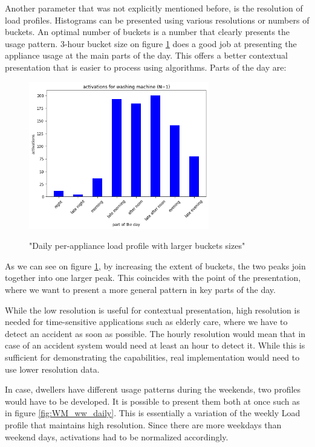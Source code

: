 Another parameter that was not explicitly mentioned before, is the resolution of load profiles. 
Histograms can be presented using various resolutions or numbers of buckets.
An optimal number of buckets is a number that clearly presents the usage pattern. 
3-hour bucket size on figure \ref{fig:4hours} does a good job at presenting the appliance usage at the main parts of the day.
This offers a better contextual presentation that is easier to process using algorithms.
Parts of the day are:

\begin{figure}[H]
	\centering
	\caption{"Daily per-appliance load profile with larger buckets sizes"}
	\includegraphics[width=0.7\textwidth]{../Figures/LPS/3_hours.png}
	\label{fig:4hours}
\end{figure}

As we can see on figure \ref{fig:4hours}, by increasing the extent of buckets, the two peaks join together into one larger peak.
This coincides with the point of the presentation, where we want to present a more general pattern in key parts of the day.

While the low resolution is useful for contextual presentation,
high resolution is needed for time-sensitive applications such as elderly care,
where we have to detect an accident as soon as possible.
The hourly resolution would mean that in case of an accident system would need at least an hour to detect it.
While this is sufficient for demonstrating the capabilities, real implementation would need to use lower resolution data.

In case, dwellers have different usage patterns during the weekends, two profiles would have to be developed.
It is possible to present them both at once such as in figure \ref{fig:WM_ww_daily}. 
This is essentially a variation of the weekly Load profile that maintains high resolution.
Since there are more weekdays than weekend days, activations had to be normalized accordingly.

